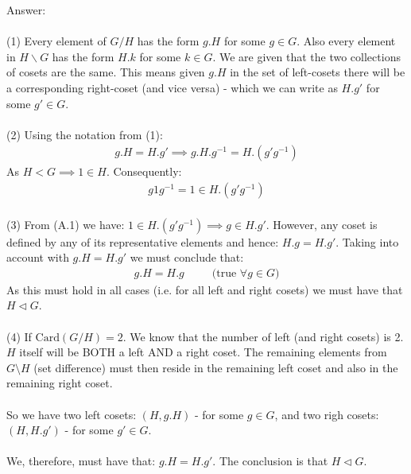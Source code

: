 \documentclass[12pt,a4paper]{article}
\begin{document}
\vspace{1cm}
\noindent
Answer:\\
\\
(1) Every element of $G/H$ has the form $g.H$ for some $g \in G$. Also every element in $H \backslash G$ has the form $H.k$ for
some $k \in G$.  We are given that the two collections of cosets are the same.
This means given $g.H$ in the set of left-cosets there will
be a corresponding right-coset (and vice versa) - which we can write as $H.g'$ for some $g' \in G$.\\
\\
(2) Using the notation from (1): 
\begin{align*}
    g.H = H.g' \implies g.H.g^{-1} = H.(g'g^{-1})
\end{align*}
As $H < G \implies 1 \in H$.
Consequently: 
\begin{align*}
    g1g^{-1} = 1 \in H.(g'g^{-1}) \tag{A.1}
\end{align*}
\\
(3) From (A.1) we have: $1 \in H.(g'g^{-1}) \implies g \in H.g'$.  However, any coset is defined by any of its representative
elements and hence: $H.g = H.g'$.  Taking into account with $g.H = H.g'$ we must conclude that:
\begin{align*}
    g.H = H.g \;\;\;\;\;\;\;\;\; \text{(true $\forall g \in G$)}
\end{align*}
As this must hold in all cases (i.e. for all left and right cosets) we must have that $H \triangleleft G$.\\
\\
(4) If $\text{Card}(G/H)=2$.  We know that the number of left (and right cosets) is 2.\\
$H$ itself will be BOTH a left AND a right coset.  The remaining elements from $G \setminus H$ (set difference) must then reside in the remaining left coset and
also in the remaining right coset.\\
\\
So we have two left cosets: $(H, g.H)$ - for some $g \in G$, and two righ cosets: $(H, H.g')$ - for some $g' \in G$.\\
\\
We, therefore, must have that: $g.H = H.g'$.  The conclusion is that $H \triangleleft G$.
\end{document}
